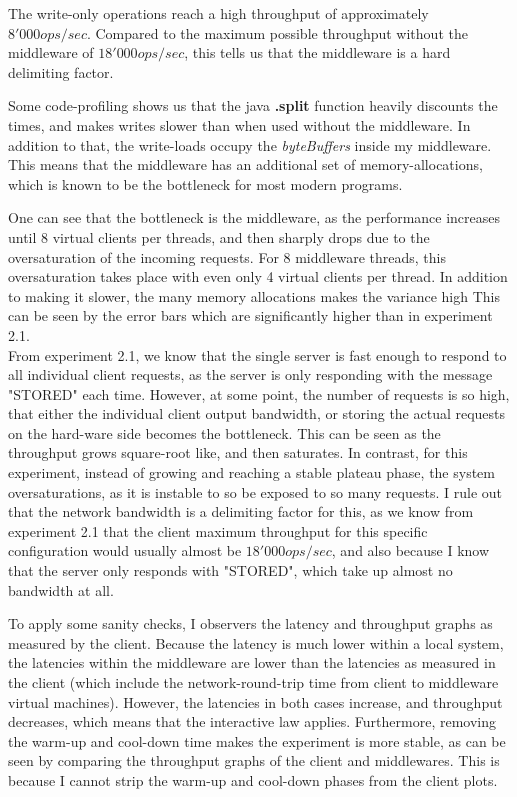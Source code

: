 \documentclass[11pt,a4paper]{article}
\begin{document}
The write-only operations reach a high throughput of approximately $8'000 ops/sec$.
Compared to the maximum possible throughput without the middleware of $18'000 ops/sec$, this tells us that the middleware is a hard delimiting factor.


Some code-profiling shows us that the java \textbf{.split} function heavily discounts the times, and makes writes slower than when used without the middleware.
In addition to that, the write-loads occupy the \textit{byteBuffers} inside my middleware.
This means that the middleware has an additional set of memory-allocations, which is known to be the bottleneck for most modern programs. 

One can see that the bottleneck is the middleware, as the performance increases until 8 virtual clients per threads, and then sharply drops due to the oversaturation of the incoming requests.
For 8 middleware threads, this oversaturation takes place with even only 4 virtual clients per thread. 
In addition to making it slower, the many memory allocations makes the variance high 
This can be seen by the error bars which are significantly higher than in experiment 2.1.
\\

From experiment 2.1, we know that the single server is fast enough to respond to all individual client requests, as the server is only responding with the message "STORED" each time.
However, at some point, the number of requests is so high, that either the individual client output bandwidth, or storing the actual requests on the hard-ware side becomes the bottleneck.
This can be seen as the throughput grows square-root like, and then saturates.
In contrast, for this experiment, instead of growing and reaching a stable plateau phase, the system oversaturations, as it is instable to so be exposed to so many requests.
I rule out that the network bandwidth is a delimiting factor for this, as we know from experiment 2.1 that the client maximum throughput for this specific configuration would usually almost be $18'000 ops/sec$, and also because I know that the server only responds with "STORED", which take up almost no bandwidth at all.

To apply some sanity checks, I observers the latency and throughput graphs as measured by the client.
Because the latency is much lower within a local system, the latencies within the middleware are lower than the latencies as measured in the client (which include the network-round-trip time from client to middleware virtual machines).
However, the latencies in both cases increase, and throughput decreases, which means that the interactive law applies.
Furthermore, removing the warm-up and cool-down time makes the experiment is more stable, as can be seen by comparing the throughput graphs of the client and middlewares.
This is because I cannot strip the warm-up and cool-down phases from the client plots.
\end{document}
